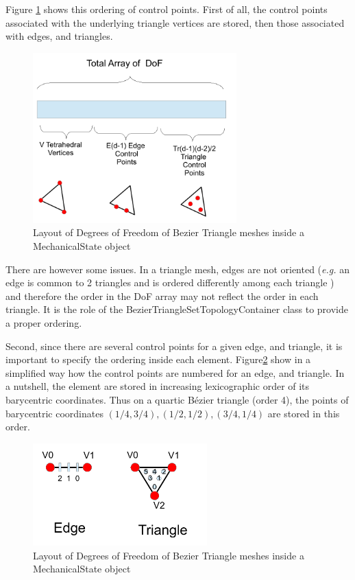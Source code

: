 \documentclass[a4paper,11pt]{article}
\newcommand{\Bezier}{{B{\'e}zier }}
\begin{document}
Figure \ref{fig:LayoutBezierTriangle} shows this ordering of control points. First of all, the control points associated with the underlying triangle vertices are stored, then those associated with edges, and triangles.

\begin{figure}[!htbp]
	\centering
    \includegraphics[width=0.70\textwidth]{DofLayoutBezierTriangle}
	\caption{Layout of Degrees of Freedom of Bezier Triangle meshes inside a MechanicalState object}
	\label{fig:LayoutBezierTriangle}
\end{figure}

There are however some issues. In a triangle mesh, edges are not oriented ({\em e.g.} an edge is common to 2 triangles and is ordered differently among each triangle ) and therefore the order in the DoF array may not reflect the order in each triangle. It is the role of the BezierTriangleSetTopologyContainer class to provide a proper ordering.

Second, since there are several control points for a given edge, and triangle, it is important to specify the ordering inside each element. Figure\ref{fig:DofBezierTriangleTesselation} show in a simplified way how the control points are numbered for an edge, and triangle. In a nutshell, the element are stored in increasing lexicographic order of its barycentric coordinates. Thus on a quartic \Bezier triangle (order 4), the points of barycentric coordinates $(1/4, 3/4), (1/2,1/2), (3/4, 1/4)$ are stored in this order.

\begin{figure}[!htbp]
	\centering
    \includegraphics[width=0.60\textwidth]{DofBezierTriangleTesselation}
	\caption{Layout of Degrees of Freedom of Bezier Triangle meshes inside a MechanicalState object}
	\label{fig:DofBezierTriangleTesselation}
\end{figure}
\end{document}
